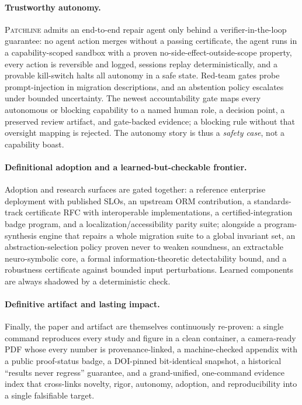 \documentclass[11pt]{article}
\newcommand{\tool}{\textsc{Patchline}}
\begin{document}
\paragraph{Trustworthy autonomy.}
\tool{} admits an end-to-end repair agent only behind a verifier-in-the-loop guarantee: no agent action
merges without a passing certificate, the agent runs in a capability-scoped sandbox with a proven
no-side-effect-outside-scope property, every action is reversible and logged, sessions replay
deterministically, and a provable kill-switch halts all autonomy in a safe state. Red-team gates probe
prompt-injection in migration descriptions, and an abstention policy escalates under bounded
uncertainty. The newest accountability gate maps every autonomous or blocking capability to a named
human role, a decision point, a preserved review artifact, and gate-backed evidence; a blocking rule
without that oversight mapping is rejected. The autonomy story is thus a \emph{safety case}, not a
capability boast.

\paragraph{Definitional adoption and a learned-but-checkable frontier.}
Adoption and research surfaces are gated together: a reference enterprise deployment with published
SLOs, an upstream ORM contribution, a standards-track certificate RFC with interoperable
implementations, a certified-integration badge program, and a localization/accessibility parity suite;
alongside a program-synthesis engine that repairs a whole migration suite to a global invariant set, an
abstraction-selection policy proven never to weaken soundness, an extractable neuro-symbolic core, a
formal information-theoretic detectability bound, and a robustness certificate against bounded input
perturbations. Learned components are always shadowed by a deterministic check.

\paragraph{Definitive artifact and lasting impact.}
Finally, the paper and artifact are themselves continuously re-proven: a single command reproduces every
study and figure in a clean container, a camera-ready PDF whose every number is provenance-linked, a
machine-checked appendix with a public proof-status badge, a DOI-pinned bit-identical snapshot, a
historical ``results never regress'' guarantee, and a grand-unified, one-command evidence index that
cross-links novelty, rigor, autonomy, adoption, and reproducibility into a single falsifiable target.
\end{document}

